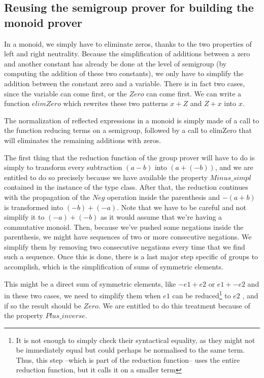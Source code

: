 \subsection {Reusing the semigroup prover for building the monoid prover}

In a monoid, we simply have to eliminate zeros, thanks to the two properties of left and right neutrality. Because the simplification of additions between a zero and another constant has already be done at the level of semigroup (by computing the addition of these two constants), we only have to simplify the addition between the constant zero and a variable. There is in fact two cases, since the variable can come first, or the $Zero$ can come first. We can write a function $elimZero$ which rewrites these two patterns $x+Z$ and $Z+x$ into $x$.


The normalization of reflected expressions in a monoid is simply made of a call to the function reducing terms on a semigroup, followed by a call to elimZero that will eliminates the remaining additions with zeros. 




The first thing that the reduction function of the group prover will have to do is simply to transform every subtraction $(a-b)$ into $(a + (-b))$, and we are entitled to do so precisely because we have available the property $Minus\_simpl$ contained in the instance of the type class.
After that, the reduction continues with the propagation of the $Neg$ operation inside the parenthesis and $-(a+b)$ is transformed into $(-b) + (-a)$. Note that we have to be careful and not simplify it to $(-a) + (-b)$ as it would assume that we're having a commutative monoid.
Then, because we've pushed some negations inside the parenthesis, we might have sequences of two or more consecutive negations. We simplify them by removing two consecutive negations every time that we find such a sequence. Once this is done, there is a last major step specific of groups to accomplish, which is the simplification of sums of symmetric elements. 

This might be a direct sum of symmetric elements, like $-e1 + e2$ or $e1 + -e2$ and in these two cases, we need to simplify them when $e1$ can be reduced\footnote{It is not enough to simply check their syntactical equality, as they might not be immediately equal but could perhaps be normalised to the same term. Thus, this step --which is part of the reduction function-- uses the entire reduction function, but it calls it on a smaller term} to $e2$ , and if so the result should be $Zero$. We are entitled to do this treatment because of the property $Plus\_inverse$.


